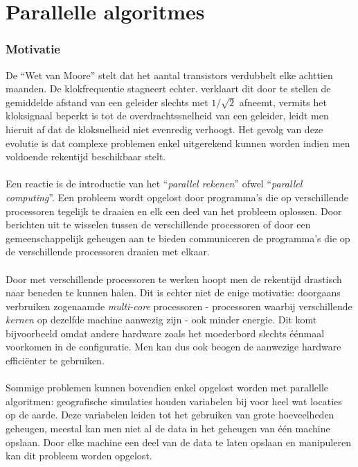 \section{Parallelle algoritmes}

\subsubsection{Motivatie}

De ``Wet van Moore''\cite{4785860} stelt dat het aantal transistors verdubbelt elke achttien maanden. De klokfrequentie stagneert echter. \cite{nomoore} verklaart dit door te stellen de gemiddelde afstand van een geleider slechts met $1/\sqrt{2}$ afneemt, vermits het kloksignaal beperkt is tot de overdrachtssnelheid van een geleider, leidt men hieruit af dat de kloksnelheid niet evenredig verhoogt. Het gevolg van deze evolutie is dat complexe problemen enkel uitgerekend kunnen worden indien men voldoende rekentijd beschikbaar stelt.
\paragraph{}
Een reactie is de introductie van het ``\emph{parallel rekenen}'' ofwel ``\emph{parallel computing}''. Een probleem wordt opgelost door programma's die op verschillende processoren tegelijk te draaien en elk een deel van het probleem oplossen. Door berichten uit te wisselen tussen de verschillende processoren of door een gemeenschappelijk geheugen aan te bieden communiceren de programma's die op de verschillende processoren draaien met elkaar.\cite{books/bc/KumarGGK94}

\paragraph{}
Door met verschillende processoren te werken hoopt men de rekentijd drastisch naar beneden te kunnen halen. Dit is echter niet de enige motivatie: doorgaans verbruiken zogenaamde \emph{multi-core} processoren - processoren waarbij verschillende \emph{kernen} op dezelfde machine aanwezig zijn - ook minder energie. Dit komt bijvoorbeeld omdat andere hardware zoals het moederbord slechts \'e\'enmaal voorkomen in de configuratie. Men kan dus ook beogen de aanwezige hardware effici\"enter te gebruiken.\cite{energyEfficency}

\paragraph{}
Sommige problemen kunnen bovendien enkel opgelost worden met parallelle algoritmen: geografische simulaties houden variabelen bij voor heel wat locaties op de aarde. Deze variabelen leiden tot het gebruiken van grote hoeveelheden geheugen, meestal kan men niet al de data in het geheugen van \'e\'en machine opslaan. Door elke machine een deel van de data te laten opslaan en manipuleren kan dit probleem worden opgelost.\cite{journals/pc/HawickCJ03}

